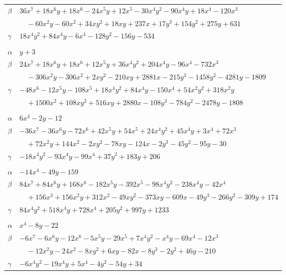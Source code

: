 \documentclass[11pt]{article}
\begin{document}
\begin{longtable}{@{}ll@{}}
$\beta$ & $36x^{7}+18x^{6}y+18x^{6}-24x^{5}y+12x^{5}-30x^{4}y^{2}-90x^{4}y+18x^{4}-120x^{3}$\\
 & $\quad -60x^{2}y-60x^{2}+34xy^{2}+18xy+237x+17y^{3}+154y^{2}+275y+631$\\
$\gamma$ & $18x^{4}y^{2}+84x^{4}y-6x^{4}-128y^{2}-156y-534$\\
\addlinespace[3pt]
\multicolumn{2}{@{}l}{$\{i,j\}=\{4,100\}$, $k_{ij}=2^{2}$}\\
$\alpha$ & $y+3$\\
$\beta$ & $24x^{7}+18x^{6}y+18x^{6}+12x^{5}y+36x^{4}y^{2}+204x^{4}y-96x^{4}-732x^{3}$\\
 & $\quad -306x^{2}y-306x^{2}+2xy^{2}-210xy+2881x-215y^{3}-1458y^{2}-4281y-1809$\\
$\gamma$ & $-48x^{6}-12x^{5}y-108x^{5}+18x^{4}y^{2}+84x^{4}y-150x^{4}+54x^{2}y^{2}+318x^{2}y$\\
 & $\quad +1500x^{2}+108xy^{2}+516xy+2880x-108y^{3}-784y^{2}-2478y-1808$\\
\addlinespace[3pt]
\multicolumn{2}{@{}l}{$\{i,j\}=\{5,29\}$, $k_{ij}=2^{4}\cdot 3$}\\
$\alpha$ & $6x^{4}-2y-12$\\
$\beta$ & $-36x^{7}-36x^{6}y-72x^{6}+42x^{5}y+54x^{5}+24x^{4}y^{2}+45x^{4}y+3x^{4}+72x^{3}$\\
 & $\quad +72x^{2}y+144x^{2}-2xy^{2}-78xy-124x-2y^{3}-45y^{2}-95y-30$\\
$\gamma$ & $-18x^{4}y^{2}-93x^{4}y-99x^{4}+37y^{2}+183y+206$\\
\addlinespace[3pt]
\multicolumn{2}{@{}l}{$\{i,j\}=\{5,30\}$, $k_{ij}=2\cdot 3\cdot 11^{2}$}\\
$\alpha$ & $-14x^{4}-49y-159$\\
$\beta$ & $84x^{7}+84x^{6}y+168x^{6}-182x^{5}y-392x^{5}-98x^{4}y^{2}-238x^{4}y-42x^{4}$\\
 & $\quad +156x^{3}+156x^{2}y+312x^{2}-49xy^{2}-373xy-609x-49y^{3}-266y^{2}-309y+174$\\
$\gamma$ & $84x^{4}y^{2}+518x^{4}y+728x^{4}+205y^{2}+997y+1233$\\
\addlinespace[3pt]
\multicolumn{2}{@{}l}{$\{i,j\}=\{5,44\}$, $k_{ij}=2^{4}\cdot 3^{3}$}\\
$\alpha$ & $x^{4}-8y-22$\\
$\beta$ & $-6x^{7}-6x^{6}y-12x^{6}-5x^{5}y-29x^{5}+7x^{4}y^{2}-x^{4}y-69x^{4}-12x^{3}$\\
 & $\quad -12x^{2}y-24x^{2}-8xy^{2}+6xy-82x-8y^{3}-2y^{2}+46y-210$\\
$\gamma$ & $-6x^{4}y^{2}-19x^{4}y+5x^{4}-4y^{2}-54y+34$\\

\end{longtable}
\end{document}
